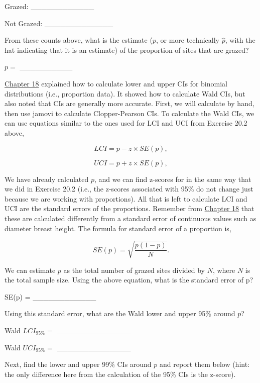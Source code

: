 \documentclass[
  openany]{krantz}
\begin{document}
Grazed: \_\_\_\_\_\_\_\_\_\_\_\_

Not Grazed: \_\_\_\_\_\_\_\_\_\_\_\_\_

From these counts above, what is the estimate (\(p\), or more technically \(\hat{p}\), with the hat indicating that it is an estimate) of the proportion of sites that are grazed?

\(p =\) \_\_\_\_\_\_\_\_\_\_

\protect\hyperlink{Chapter_18}{Chapter 18} explained how to calculate lower and upper CIs for binomial distributions (i.e., proportion data).
It showed how to calculate Wald CIs, but also noted that  CIs are generally more accurate.
First, we will calculate  by hand, then use jamovi to calculate Clopper-Pearson CIs.
To calculate the Wald CIs, we can use equations similar to the ones used for LCI and UCI from Exercise 20.2 above,

\[LCI = p - z \times SE(p),\]

\[UCI = p + z \times SE(p),\]

We have already calculated \(p\), and we can find z-scores for  in the same way that we did in Exercise 20.2 (i.e., the z-scores associated with 95\%  do not change just because we are working with proportions).
All that is left to calculate LCI and UCI are the standard errors of the proportions.
Remember from \protect\hyperlink{Chapter_18}{Chapter 18} that these are calculated differently from a standard error of continuous values such as diameter breast height.
The formula for standard error of a proportion is,

\[SE(p) = \sqrt{\frac{p\left(1 - p\right)}{N}}.\]

We can estimate \(p\) as the total number of grazed sites divided by \(N\), where \(N\) is the total sample size.
Using the above equation, what is the standard error of p?

SE(p) = \_\_\_\_\_\_\_\_\_\_\_\_

Using this standard error, what are the Wald lower and upper 95\%  around \(p\)?

Wald \(LCI_{95\%} =\) \_\_\_\_\_\_\_\_\_\_\_\_\_\_

Wald \(UCI_{95\%} =\) \_\_\_\_\_\_\_\_\_\_\_\_\_\_

Next, find the lower and upper 99\% CIs around \(p\) and report them below (hint: the only difference here from the calculation of the 95\% CIs is the z-score).
\end{document}
